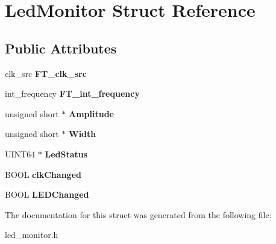 \hypertarget{struct_led_monitor}{\section{Led\-Monitor Struct Reference}
\label{struct_led_monitor}
}
\subsection*{Public Attributes}
\begin{DoxyCompactItemize}
\item 
\hypertarget{struct_led_monitor_a8434d0702334aff15a8109da90624c54}{clk\-\_\-src {\bfseries F\-T\-\_\-clk\-\_\-src}}\label{struct_led_monitor_a8434d0702334aff15a8109da90624c54}

\item 
\hypertarget{struct_led_monitor_a175aed222907c7646dac954735732170}{int\-\_\-frequency {\bfseries F\-T\-\_\-int\-\_\-frequency}}\label{struct_led_monitor_a175aed222907c7646dac954735732170}

\item 
\hypertarget{struct_led_monitor_ab1a7b4eb9f928e9f3073dbeb87cb4b4b}{unsigned short $\ast$ {\bfseries Amplitude}}\label{struct_led_monitor_ab1a7b4eb9f928e9f3073dbeb87cb4b4b}

\item 
\hypertarget{struct_led_monitor_a1bf2e8e018756a0a4a960b93bfcb3ff8}{unsigned short $\ast$ {\bfseries Width}}\label{struct_led_monitor_a1bf2e8e018756a0a4a960b93bfcb3ff8}

\item 
\hypertarget{struct_led_monitor_a818483576aed16a8325140382126e0ae}{U\-I\-N\-T64 $\ast$ {\bfseries Led\-Status}}\label{struct_led_monitor_a818483576aed16a8325140382126e0ae}

\item 
\hypertarget{struct_led_monitor_a8009ea780b190bf5ac82b875c8ffc971}{B\-O\-O\-L {\bfseries clk\-Changed}}\label{struct_led_monitor_a8009ea780b190bf5ac82b875c8ffc971}

\item 
\hypertarget{struct_led_monitor_a4714fc1aaea40f9c91038721198ee73a}{B\-O\-O\-L {\bfseries L\-E\-D\-Changed}}\label{struct_led_monitor_a4714fc1aaea40f9c91038721198ee73a}

\end{DoxyCompactItemize}


The documentation for this struct was generated from the following file\-:\begin{DoxyCompactItemize}
\item 
led\-\_\-monitor.\-h\end{DoxyCompactItemize}
